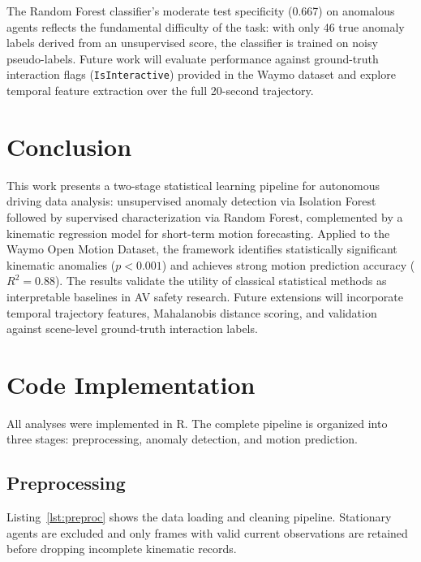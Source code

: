 \documentclass[conference]{IEEEtran}
\begin{document}
The Random Forest classifier's moderate test specificity (0.667) on anomalous agents reflects the fundamental difficulty of the task: with only 46 true anomaly labels derived from an unsupervised score, the classifier is trained on noisy pseudo-labels. Future work will evaluate performance against ground-truth interaction flags (\texttt{IsInteractive}) provided in the Waymo dataset and explore temporal feature extraction over the full 20-second trajectory.

\section{Conclusion}

This work presents a two-stage statistical learning pipeline for autonomous driving data analysis: unsupervised anomaly detection via Isolation Forest followed by supervised characterization via Random Forest, complemented by a kinematic regression model for short-term motion forecasting. Applied to the Waymo Open Motion Dataset, the framework identifies statistically significant kinematic anomalies ($p < 0.001$) and achieves strong motion prediction accuracy ($R^2 = 0.88$). The results validate the utility of classical statistical methods as interpretable baselines in AV safety research. Future extensions will incorporate temporal trajectory features, Mahalanobis distance scoring, and validation against scene-level ground-truth interaction labels.

\section{Code Implementation}

All analyses were implemented in R. The complete pipeline is organized into three stages: preprocessing, anomaly detection, and motion prediction.

\subsection{Preprocessing}

Listing~\ref{lst:preproc} shows the data loading and cleaning pipeline. Stationary agents are excluded and only frames with valid current observations are retained before dropping incomplete kinematic records.
\end{document}
